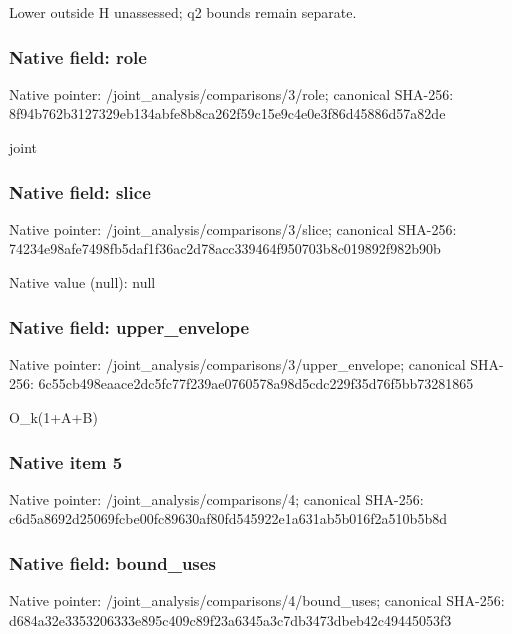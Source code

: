 \documentclass[10pt,a4paper]{article}
\begin{document}
\begingroup\raggedright\sloppy Lower outside H unassessed;\allowbreak{} q2 bounds remain separate.\par\endgroup

\subsubsection{Native field: role}
Native pointer: /joint\_\allowbreak{}analysis/comparisons/3/role; canonical SHA-256: 8f94b762b3127329eb134abfe8b8ca262f59c15e9c4e0e3f86d45886d57a82de

\begingroup\raggedright\sloppy joint\par\endgroup

\subsubsection{Native field: slice}
Native pointer: /joint\_\allowbreak{}analysis/comparisons/3/slice; canonical SHA-256: 74234e98afe7498fb5daf1f36ac2d78acc339464f950703b8c019892f982b90b

Native value (null): null

\subsubsection{Native field: upper\_\allowbreak{}envelope}
Native pointer: /joint\_\allowbreak{}analysis/comparisons/3/upper\_\allowbreak{}envelope; canonical SHA-256: 6c55cb498eaace2dc5fc77f239ae0760578a98d5cdc229f35d76f5bb73281865

\begingroup\raggedright\sloppy O\_\allowbreak{}k(1+A+B)\par\endgroup

\subsubsection{Native item 5}
Native pointer: /joint\_\allowbreak{}analysis/comparisons/4; canonical SHA-256: c6d5a8692d25069fcbe00fc89630af80fd545922e1a631ab5b016f2a510b5b8d

\subsubsection{Native field: bound\_\allowbreak{}uses}
Native pointer: /joint\_\allowbreak{}analysis/comparisons/4/bound\_\allowbreak{}uses; canonical SHA-256: d684a32e3353206333e895c409c89f23a6345a3c7db3473dbeb42c49445053f3
\end{document}

